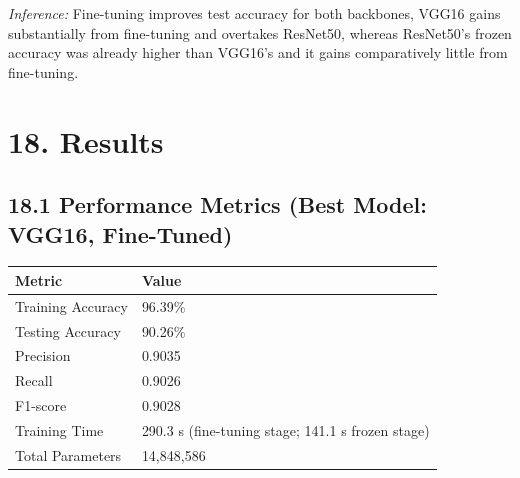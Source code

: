 \documentclass[11pt]{article}
\begin{document}
\textit{Inference:} Fine-tuning improves test accuracy for both
backbones, VGG16 gains substantially
from fine-tuning and overtakes ResNet50,
whereas ResNet50's frozen accuracy was already higher than VGG16's and it
gains comparatively little from fine-tuning.


\section*{18. Results}

\subsection*{18.1 Performance Metrics (Best Model: VGG16, Fine-Tuned)}

\begin{center}

\begin{tabular}{|p{5cm}|p{4cm}|}

\hline

Metric & Value\\

\hline

Training Accuracy & 96.39\%\\

\hline

Testing Accuracy & 90.26\%\\

\hline

Precision & 0.9035\\

\hline

Recall & 0.9026\\

\hline

F1-score & 0.9028\\

\hline

Training Time & 290.3 s (fine-tuning stage; 141.1 s frozen stage)\\

\hline

Total Parameters & 14,848,586\\

\hline

\end{tabular}

\end{center}
\end{document}
